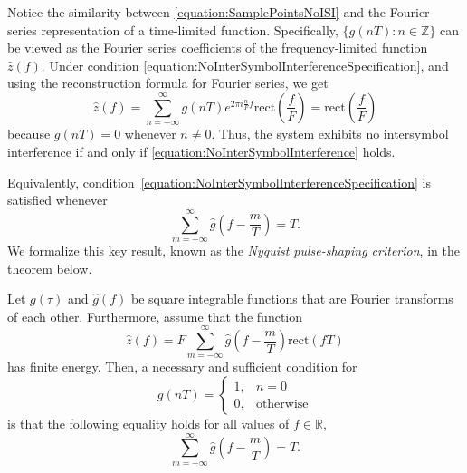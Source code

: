Notice the similarity between \eqref{equation:SamplePointsNoISI} and the Fourier series representation of a time-limited function.
Specifically, $\{ g(nT) : n \in \mathbb{Z} \}$ can be viewed as the Fourier series coefficients of the frequency-limited function $\hat{z}(f)$.
Under condition \eqref{equation:NoInterSymbolInterferenceSpecification}, and using the reconstruction formula for Fourier series, we get
\begin{equation} \label{equation:NoInterSymbolInterference}
\hat{z}(f) = \sum_{n = -\infty}^{\infty} g(nT) e^{2 \pi i \frac{n}{F} f}
\mathrm{rect} \left( \frac{f}{F} \right)
= \mathrm{rect} \left( \frac{f}{F} \right)
\end{equation}
because $g(nT) = 0$ whenever $n \neq 0$.
Thus, the system exhibits no intersymbol interference if and only if \eqref{equation:NoInterSymbolInterference} holds.

Equivalently, condition~\eqref{equation:NoInterSymbolInterferenceSpecification} is satisfied whenever
\begin{equation} \label{equation:NyquistNoISI}
\sum_{m = -\infty}^{\infty} \hat{g} \left( f - \frac{m}{T} \right) = T .
\end{equation}
We formalize this key result, known as the \emph{Nyquist pulse-shaping criterion}, in the theorem below.

\begin{theorem}[Nyquist] \label{theorem:NyquistPulseCriterion}
Let $g(\tau)$ and $\hat{g}(f)$ be square integrable functions that are Fourier transforms of each other.
Furthermore, assume that the function
\begin{equation*}
\hat{z} (f) = F \sum_{m=-\infty}^{\infty} \hat{g} \left( f - \frac{m}{T} \right)
\mathrm{rect} (fT)
\end{equation*}
has finite energy.
Then, a necessary and sufficient condition for
\begin{equation*}
g(nT) = \begin{cases} 1, & n = 0 \\
0, & \text{otherwise} \end{cases}
\end{equation*}
is that the following equality holds for all values of $f \in \mathbb{R}$,
\begin{equation} \label{equation:NyquistCriterionFrequencyCondition}
\sum_{m=-\infty}^{\infty} \hat{g} \left( f - \frac{m}{T} \right) = T .
\end{equation}
\end{theorem}

